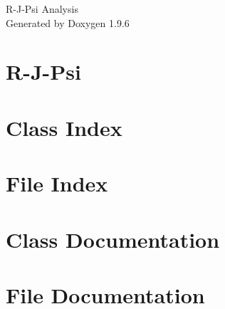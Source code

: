 \documentclass[twoside]{book}
\newcommand{\+}{\discretionary{\mbox{\scriptsize$\hookleftarrow$}}{}{}}
\newcommand{\clearemptydoublepage}{%
    \newpage{\pagestyle{empty}\cleardoublepage}%
  }
\begin{document}
  \raggedbottom
    \hypersetup{pageanchor=false,
                bookmarksnumbered=true,
                pdfencoding=unicode
               }
  \begin{titlepage}
  \vspace*{7cm}
  \begin{center}%
  {\Large R-\/\+J-\/\+Psi Analysis}\\
  \vspace*{1cm}
  {\large Generated by Doxygen 1.9.6}\\
  \end{center}
  \end{titlepage}
  \clearemptydoublepage
  \tableofcontents
  \clearemptydoublepage
  \hypersetup{pageanchor=true}
\chapter{R-\/\+J-\/\+Psi}
\label{index}\hypertarget{index}{}
\chapter{Class Index}

\chapter{File Index}

\chapter{Class Documentation}



\chapter{File Documentation}
























  \backmatter
  \newpage
  \clearemptydoublepage
  \printindex
\end{document}
